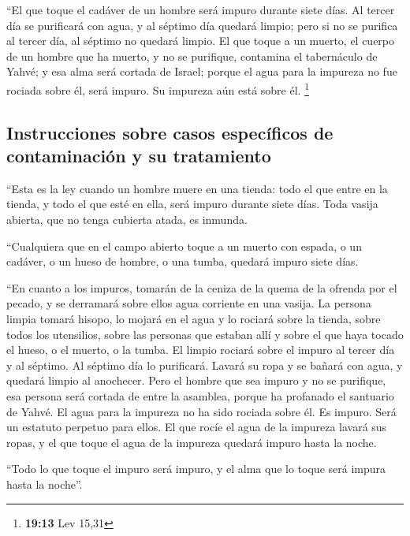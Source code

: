  ``El que toque el cadáver de un hombre será impuro
durante siete días.  Al tercer día se purificará con
agua, y al séptimo día quedará limpio; pero si no se purifica al tercer
día, al séptimo no quedará limpio.  El que toque a un
muerto, el cuerpo de un hombre que ha muerto, y no se purifique,
contamina el tabernáculo de Yahvé; y esa alma será cortada de Israel;
porque el agua para la impureza no fue rociada sobre él, será impuro. Su
impureza aún está sobre él. \footnote{\textbf{19:13} Lev 15,31}

\hypertarget{instrucciones-sobre-casos-especuxedficos-de-contaminaciuxf3n-y-su-tratamiento}{%
\subsection{Instrucciones sobre casos específicos de contaminación y su
tratamiento}\label{instrucciones-sobre-casos-especuxedficos-de-contaminaciuxf3n-y-su-tratamiento}}

 ``Esta es la ley cuando un hombre muere en una tienda:
todo el que entre en la tienda, y todo el que esté en ella, será impuro
durante siete días.  Toda vasija abierta, que no tenga
cubierta atada, es inmunda.

 ``Cualquiera que en el campo abierto toque a un muerto
con espada, o un cadáver, o un hueso de hombre, o una tumba, quedará
impuro siete días.

 ``En cuanto a los impuros, tomarán de la ceniza de la
quema de la ofrenda por el pecado, y se derramará sobre ellos agua
corriente en una vasija.  La persona limpia tomará
hisopo, lo mojará en el agua y lo rociará sobre la tienda, sobre todos
los utensilios, sobre las personas que estaban allí y sobre el que haya
tocado el hueso, o el muerto, o la tumba.  El limpio
rociará sobre el impuro al tercer día y al séptimo. Al séptimo día lo
purificará. Lavará su ropa y se bañará con agua, y quedará limpio al
anochecer.  Pero el hombre que sea impuro y no se
purifique, esa persona será cortada de entre la asamblea, porque ha
profanado el santuario de Yahvé. El agua para la impureza no ha sido
rociada sobre él. Es impuro.  Será un estatuto perpetuo
para ellos. El que rocíe el agua de la impureza lavará sus ropas, y el
que toque el agua de la impureza quedará impuro hasta la noche.

 ``Todo lo que toque el impuro será impuro, y el alma que
lo toque será impura hasta la noche''.


